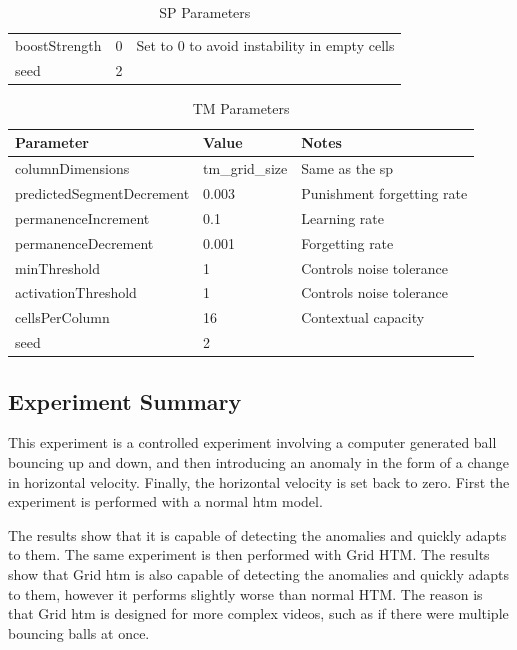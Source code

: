 \begin{table}[H]
\begin{tabularx}{\linewidth}{@{}XlX@{}}
        boostStrength      & 0              & Set to 0 to avoid instability in empty cells                                                                                                          \\
        seed               & 2              &                                                                                                                                                       \\
        \bottomrule
    \end{tabularx}
    \caption{SP Parameters}
    \label{tab:bb_sp_gridhtm_param}
\end{table}
\begin{table}[H]
    \centering
    \begin{tabularx}{\linewidth}{@{}XlX@{}}
        \toprule
        \textbf{Parameter}        & \textbf{Value} & \textbf{Notes}             \\
        \midrule
        columnDimensions          & tm\_grid\_size & Same as the \gls*{sp}      \\
        predictedSegmentDecrement & 0.003          & Punishment forgetting rate \\
        permanenceIncrement       & 0.1            & Learning rate              \\
        permanenceDecrement       & 0.001          & Forgetting rate            \\
        minThreshold              & 1              & Controls noise tolerance   \\
        activationThreshold       & 1              & Controls noise tolerance   \\
        cellsPerColumn            & 16             & Contextual capacity        \\
        seed                      & 2              &                            \\
        \bottomrule
    \end{tabularx}
    \caption{TM Parameters}
    \label{tab:bb_tm_gridhtm_param}
\end{table}
\subsection{Experiment Summary}
This experiment is a controlled experiment involving a computer generated ball bouncing up and down, and then introducing an anomaly in the form of a change in horizontal velocity. Finally, the horizontal velocity is set back to zero. First the experiment is performed with a normal \gls*{htm} model.
\par
The results show that it is capable of detecting the anomalies and quickly adapts to them. The same experiment is then performed with Grid HTM. The results show that Grid \gls*{htm} is also capable of detecting the anomalies and quickly adapts to them, however it performs slightly worse than normal HTM. The reason is that Grid \gls*{htm} is designed for more complex videos, such as if there were multiple bouncing balls at once.
\clearpage
